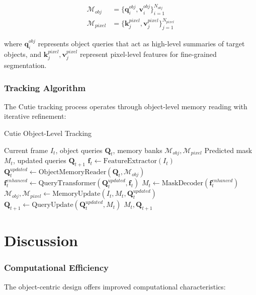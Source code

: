 \documentclass[12pt]{article}
\begin{document}
\begin{align}
  \mathcal{M}_{obj}   & = \{\mathbf{q}_i^{obj}, \mathbf{v}_i^{obj}\}_{i=1}^{N_{obj}}       \\
  \mathcal{M}_{pixel} & = \{\mathbf{k}_j^{pixel}, \mathbf{v}_j^{pixel}\}_{j=1}^{N_{pixel}}
\end{align}

where $\mathbf{q}_i^{obj}$ represents object queries that act as high-level summaries of target objects, and $\mathbf{k}_j^{pixel}, \mathbf{v}_j^{pixel}$ represent pixel-level features for fine-grained segmentation.

\subsubsection{Tracking Algorithm}

The Cutie tracking process operates through object-level memory reading with iterative refinement:

\begin{algorithm}[H]
  \caption{Cutie Object-Level Tracking}
  \begin{algorithmic}[1]
    \REQUIRE Current frame $I_t$, object queries $\mathbf{Q}_t$, memory banks $\mathcal{M}_{obj}, \mathcal{M}_{pixel}$
    \ENSURE Predicted mask $M_t$, updated queries $\mathbf{Q}_{t+1}$
    \STATE $\mathbf{f}_t \leftarrow \text{FeatureExtractor}(I_t)$
    \STATE $\mathbf{Q}_t^{updated} \leftarrow \text{ObjectMemoryReader}(\mathbf{Q}_t, \mathcal{M}_{obj})$
    \STATE $\mathbf{f}_t^{enhanced} \leftarrow \text{QueryTransformer}(\mathbf{Q}_t^{updated}, \mathbf{f}_t)$
    \STATE $M_t \leftarrow \text{MaskDecoder}(\mathbf{f}_t^{enhanced})$
    \STATE $\mathcal{M}_{obj}, \mathcal{M}_{pixel} \leftarrow \text{MemoryUpdate}(I_t, M_t, \mathbf{Q}_t^{updated})$
    \STATE $\mathbf{Q}_{t+1} \leftarrow \text{QueryUpdate}(\mathbf{Q}_t^{updated}, M_t)$
    \RETURN $M_t, \mathbf{Q}_{t+1}$
  \end{algorithmic}
\end{algorithm}

\section{Discussion}

\subsubsection{Computational Efficiency}

The object-centric design offers improved computational characteristics:
\end{document}
